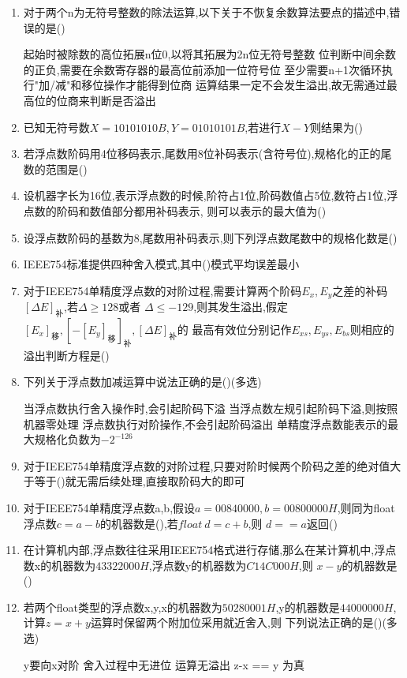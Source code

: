 \documentclass[12pt, a4paper, oneside, UTF8]{ctexbook}
\begin{document}
\begin{enumerate}
    \item 对于两个n为无符号整数的除法运算,以下关于不恢复余数算法要点的描述中,错误的是(\qquad)
    \begin{choices}[1]
        \task 起始时被除数的高位拓展n位0,以将其拓展为2n位无符号整数
        \task 位判断中间余数的正负,需要在余数寄存器的最高位前添加一位符号位
        \task 至少需要n+1次循环执行"加/减"和移位操作才能得到位商
        \task 运算结果一定不会发生溢出,故无需通过最高位的位商来判断是否溢出
    \end{choices}

    \item 已知无符号数$X=10101010B,Y=01010101B$,若进行$X-Y$则结果为(\qquad)
    \item 若浮点数阶码用4位移码表示,尾数用8位补码表示(含符号位),规格化的正的尾数的范围是(\qquad)
    \item 设机器字长为16位,表示浮点数的时候,阶符占1位,阶码数值占5位,数符占1位,浮点数的阶码和数值部分都用补码表示,
    则可以表示的最大值为(\qquad)
    \item 设浮点数阶码的基数为8,尾数用补码表示,则下列浮点数尾数中的规格化数是(\qquad)
    \item IEEE754标准提供四种舍入模式,其中(\qquad)模式平均误差最小
    \item 对于IEEE754单精度浮点数的对阶过程,需要计算两个阶码$E_x,E_y$之差的补码$[\Delta E]_{\text{补}}$,若$\Delta \geq 128$或者
    $\Delta \leq -129$,则其发生溢出,假定$[E_x]_{\text{移}},\left[-[E_y]_{\text{移}}\right]_{\text{补}},[\Delta E]_{\text{补}}$的 
    最高有效位分别记作$E_{xs},E_{ys},E_{bs}$则相应的溢出判断方程是(\qquad)
    \item 下列关于浮点数加减运算中说法正确的是(\qquad)(多选)
    \begin{choices}[1]
        \task 当浮点数执行舍入操作时,会引起阶码下溢
        \task 当浮点数左规引起阶码下溢,则按照机器零处理
        \task 浮点数执行对阶操作,不会引起阶码溢出
        \task 单精度浮点数能表示的最大规格化负数为$-2^{-126}$
    \end{choices}
    \item 对于IEEE754单精度浮点数的对阶过程,只要对阶时候两个阶码之差的绝对值大于等于(\qquad)就无需后续处理,直接取阶码大的即可
    \item 对于IEEE754单精度浮点数a,b,假设$a=00840000,b=00800000H$,则同为float浮点数$c=a-b$的机器数是(\qquad),若$float\ d=c+b$,则
    $d==a$返回(\qquad)
    \item 在计算机内部,浮点数往往采用IEEE754格式进行存储,那么在某计算机中,浮点数x的机器数为$43322000H$,浮点数y的机器数为$C14C000H$,则
    $x-y$的机器数是(\qquad)
    \item 若两个float类型的浮点数x,y,x的机器数为$50280001H$,y的机器数是$44000000H$,计算$z=x+y$运算时保留两个附加位采用就近舍入,则
    下列说法正确的是(\qquad)(多选)
    \begin{choices}[1]
        \task y要向x对阶
        \task 舍入过程中无进位
        \task 运算无溢出
        \task z-x == y 为真
    \end{choices}


\end{enumerate}
\end{document}
